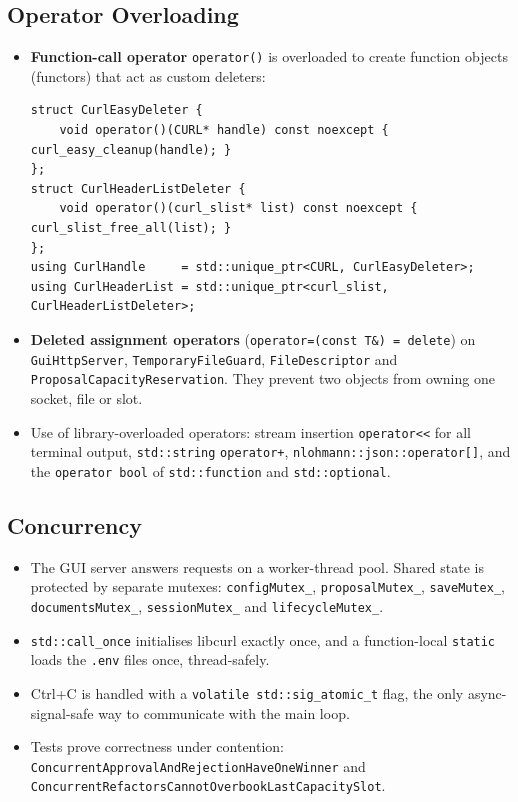 \documentclass[12pt,a4paper,oneside]{book}
\begin{document}
\subsection{Operator Overloading}

\begin{itemize}
  \item \textbf{Function-call operator} \texttt{operator()} is overloaded to
    create function objects (functors) that act as custom deleters:
\begin{lstlisting}[style=codeagentcpp,caption={Overloaded \texttt{operator()} used as a smart-pointer deleter},label={lst:ca-functor}]
struct CurlEasyDeleter {
    void operator()(CURL* handle) const noexcept { curl_easy_cleanup(handle); }
};
struct CurlHeaderListDeleter {
    void operator()(curl_slist* list) const noexcept { curl_slist_free_all(list); }
};
using CurlHandle     = std::unique_ptr<CURL, CurlEasyDeleter>;
using CurlHeaderList = std::unique_ptr<curl_slist, CurlHeaderListDeleter>;
\end{lstlisting}
  \item \textbf{Deleted assignment operators}
    (\texttt{operator=(const T\&) = delete}) on \texttt{GuiHttpServer},
    \texttt{TemporaryFileGuard}, \texttt{FileDescriptor} and
    \texttt{ProposalCapacityReservation}. They prevent two objects from owning
    one socket, file or slot.
  \item Use of library-overloaded operators: stream insertion
    \texttt{operator<{}<} for all terminal output, \texttt{std::\allowbreak{}string}
    \texttt{operator+}, \texttt{nlohmann::\allowbreak{}json::\allowbreak{}operator[]}, and the
    \texttt{operator bool} of \texttt{std::\allowbreak{}function} and
    \texttt{std::\allowbreak{}optional}.
\end{itemize}

\subsection{Concurrency}
\begin{itemize}
  \item The GUI server answers requests on a worker-thread pool. Shared state
    is protected by separate mutexes: \texttt{configMutex\_},
    \texttt{proposalMutex\_}, \texttt{saveMutex\_}, \texttt{documentsMutex\_},
    \texttt{sessionMutex\_} and \texttt{lifecycleMutex\_}.
  \item \texttt{std::\allowbreak{}call\_once} initialises libcurl exactly once, and a
    function-local \texttt{static} loads the \texttt{.env} files once,
    thread-safely.
  \item Ctrl+C is handled with a \texttt{volatile std::\allowbreak{}sig\_atomic\_t} flag,
    the only async-signal-safe way to communicate with the main loop.
  \item \raggedright %
    Tests prove correctness under contention:
    \texttt{ConcurrentApprovalAndRejectionHaveOneWinner} and
    \texttt{ConcurrentRefactorsCannotOverbookLastCapacitySlot}.
\end{itemize}
\end{document}
